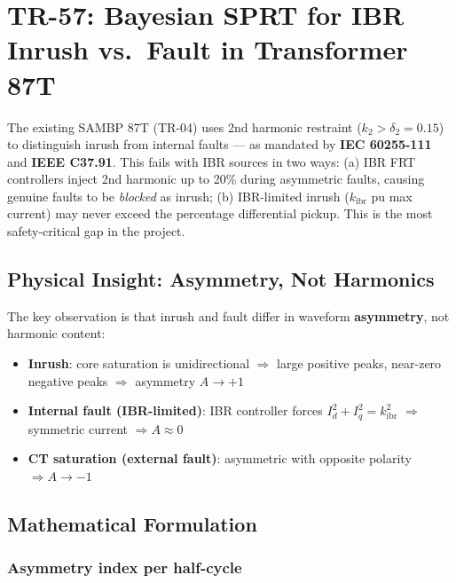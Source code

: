 \documentclass[12pt, a4paper]{report}
\begin{document}
\section{TR-57: Bayesian SPRT for IBR Inrush vs.\ Fault in Transformer 87T}

\begin{tcolorbox}[gapbox, title={Research Gap — TR-57}]
The existing SAMBP 87T (TR-04) uses 2nd harmonic restraint ($k_2 > \delta_2 = 0.15$) to distinguish inrush from internal faults — as mandated by \textbf{IEC 60255-111} and \textbf{IEEE C37.91}. This fails with IBR sources in two ways: (a) IBR FRT controllers inject 2nd harmonic up to 20\% during asymmetric faults, causing genuine faults to be \textit{blocked} as inrush; (b) IBR-limited inrush ($k_\mathrm{ibr}$ pu max current) may never exceed the percentage differential pickup. This is the most safety-critical gap in the project.
\end{tcolorbox}

\subsection{Physical Insight: Asymmetry, Not Harmonics}

The key observation is that inrush and fault differ in waveform \textbf{asymmetry}, not harmonic content:
\begin{itemize}[nosep]
  \item \textbf{Inrush}: core saturation is unidirectional $\Rightarrow$ large positive peaks, near-zero negative peaks $\Rightarrow$ asymmetry $A \to +1$
  \item \textbf{Internal fault (IBR-limited)}: IBR controller forces $I_d^2 + I_q^2 = k_\mathrm{ibr}^2$ $\Rightarrow$ symmetric current $\Rightarrow A \approx 0$
  \item \textbf{CT saturation (external fault)}: asymmetric with opposite polarity $\Rightarrow A \to -1$
\end{itemize}

\subsection{Mathematical Formulation}

\subsubsection{Asymmetry index per half-cycle}
\end{document}
